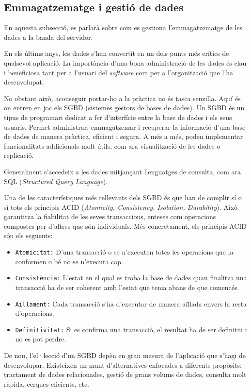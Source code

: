\documentclass[a4paper,12pt]{ThesisStyle}
\begin{document}
\subsection{Emmagatzematge i gestió de dades}

En aquesta subsecció, es parlarà sobre com es gestiona l'emmagatzematge de les dades a la banda del servidor.

En els últims anys, les dades s'han convertit en un dels punts més crítics de qualsevol aplicació. La importància d'una bona administració de les dades és clau i beneficiosa tant per a l'usuari del \textit{software} com per a l'organització que l'ha desenvolupat.

No obstant això, aconseguir portar-ho a la pràctica no és tasca senzilla. Aquí és on entren en joc els SGBD (sistemes gestors de bases de dades). Un SGBD és un tipus de programari dedicat a fer d'interfície entre la base de dades i els seus usuaris. Permet administrar, emmagatzemar i recuperar la informació d'una base de dades de manera pràctica, eficient i segura. A més a més, poden implementar funcionalitats addicionals molt útils, com ara visualització de les dades o replicació.

Generalment s'accedeix a les dades mitjançant llenguatges de consulta, com ara SQL (\textit{Structured Query Language}).

Una de les característiques més rellevants dels SGBD és que han de complir sí o sí tots els principis ACID (\textit{Atomicity, Consistency, Isolation, Durability}). Això garantitza la fiabilitat de les seves transaccions, enteses com operacions compostes per d'altres que són individuals. Més concretament, els principis ACID són els següents:
\begin{itemize}
  \item \texttt{Atomicitat:} D'una transacció o se n'executen totes les operacions que la conformen o bé no se n'executa cap.
  \item \texttt{Consistència:} L'estat en el qual es troba la base de dades quan finalitza una transacció ha de ser coherent amb l'estat que tenia abans de que comencés.
  \item \texttt{Aïllament:} Cada transacció s'ha d'executar de manera aïllada envers la resta d'operacions.
  \item \texttt{Definitivitat:} Si es confirma una transacció, el resultat ha de ser definitiu i no es pot perdre.
\end{itemize}

De nou, l'el·lecció d'un SGBD depèn en gran mesura de l'aplicació que s'hagi de desenvolupar. Existeixen un munt d'alternatives enfocades a diferents propòsits: tractament de dades relacionades, gestió de grans volums de dades, consulta molt ràpida, cerques eficients, etc.
\end{document}
